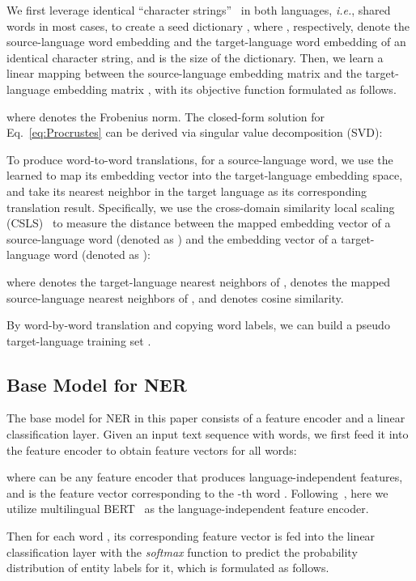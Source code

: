 \documentclass{article}
\newcommand\ie{\textit{i.e.}}
\begin{document}
We first leverage identical ``character strings''~\cite{smith2017offline} in both languages, \ie{}, shared words in most cases, to create a seed dictionary , where , respectively, denote the source-language word embedding and the target-language word embedding of an identical character string, and  is the size of the dictionary. Then, we learn a linear mapping  between the source-language embedding matrix  and the target-language embedding matrix , with its objective function formulated as follows. 

where  denotes the Frobenius norm. 
The closed-form solution for Eq.~\ref{eq:Procrustes} can be derived via singular value decomposition (SVD):



To produce word-to-word translations, for a source-language word, we use the learned  to map its embedding vector into the target-language embedding space, and take its nearest neighbor in the target language as its corresponding translation result.
Specifically, we use the cross-domain similarity local scaling (CSLS)~\cite{lample2018word} to measure the distance between the mapped embedding vector of a source-language word (denoted as ) and the embedding vector of a target-language word (denoted as ):



where  denotes the  target-language nearest neighbors of ,  denotes the  mapped source-language nearest neighbors of , and  denotes cosine similarity. 



By word-by-word translation and copying word labels, we can build a pseudo target-language training set .

\subsection{Base Model for NER}
\label{sec:base_model}
The base model for NER in this paper consists of a feature encoder and a linear classification layer. 
Given an input text sequence  with  words, we first feed it into the feature encoder  to obtain feature vectors  for all words:

where  can be any feature encoder that produces language-independent features, and  is the feature vector corresponding to the -th word . Following~\cite{wu2019beto}, here we utilize multilingual BERT~\cite{devlin2019bert} as the language-independent feature encoder.

Then for each word , its corresponding feature vector  is fed into the linear classification layer with the \emph{softmax} function to predict the probability distribution of entity labels for it, which is formulated as follows.
\end{document}

